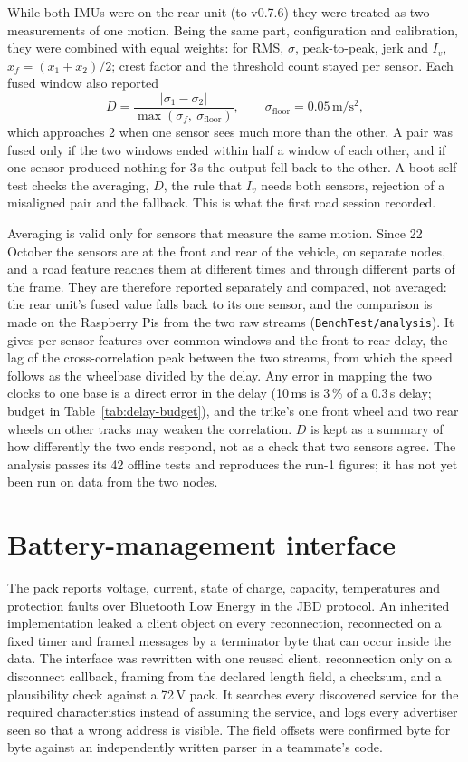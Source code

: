 While both IMUs were on the rear unit (to v0.7.6) they were treated as two measurements of one motion. Being the same part, configuration and calibration, they were combined with equal weights: for RMS, $\sigma$, peak-to-peak, jerk and $I_v$, $x_f = (x_1 + x_2)/2$; crest factor and the threshold count stayed per sensor. Each fused window also reported
\begin{equation}
D = \frac{\lvert \sigma_1 - \sigma_2 \rvert}{\max(\sigma_f,\ \sigma_{\mathrm{floor}})}, \qquad \sigma_{\mathrm{floor}} = 0.05\,\mathrm{m/s^2},
\label{eq:disagreement}
\end{equation}
which approaches 2 when one sensor sees much more than the other. A pair was fused only if the two windows ended within half a window of each other, and if one sensor produced nothing for 3\,s the output fell back to the other. A boot self-test checks the averaging, $D$, the rule that $I_v$ needs both sensors, rejection of a misaligned pair and the fallback. This is what the first road session recorded.

Averaging is valid only for sensors that measure the same motion. Since 22 October the sensors are at the front and rear of the vehicle, on separate nodes, and a road feature reaches them at different times and through different parts of the frame. They are therefore reported separately and compared, not averaged: the rear unit's fused value falls back to its one sensor, and the comparison is made on the Raspberry Pis from the two raw streams (\texttt{BenchTest/analysis}). It gives per-sensor features over common windows and the front-to-rear delay, the lag of the cross-correlation peak between the two streams, from which the speed follows as the wheelbase divided by the delay. Any error in mapping the two clocks to one base is a direct error in the delay (10\,ms is 3\,\% of a 0.3\,s delay; budget in Table~\ref{tab:delay-budget}), and the trike's one front wheel and two rear wheels on other tracks may weaken the correlation. $D$ is kept as a summary of how differently the two ends respond, not as a check that two sensors agree. The analysis passes its 42 offline tests and reproduces the run-1 figures; it has not yet been run on data from the two nodes.

\section{Battery-management interface}
\label{sec:impl-bms}

The pack reports voltage, current, state of charge, capacity, temperatures and protection faults over Bluetooth Low Energy in the JBD protocol. An inherited implementation leaked a client object on every reconnection, reconnected on a fixed timer and framed messages by a terminator byte that can occur inside the data. The interface was rewritten with one reused client, reconnection only on a disconnect callback, framing from the declared length field, a checksum, and a plausibility check against a 72\,V pack. It searches every discovered service for the required characteristics instead of assuming the service, and logs every advertiser seen so that a wrong address is visible. The field offsets were confirmed byte for byte against an independently written parser in a teammate's code.

